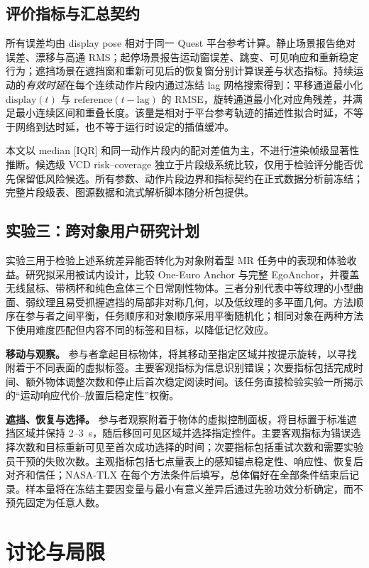 \documentclass[review]{vgtc}
\begin{document}
\subsection{评价指标与汇总契约}

所有误差均由 display pose 相对于同一 Quest 平台参考计算。静止场景报告绝对误差、漂移与高通 RMS；起停场景报告运动窗误差、跳变、可见响应和重新稳定行为；遮挡场景在遮挡窗和重新可见后的恢复窗分别计算误差与状态指标。持续运动的\emph{有效时延}在每个连续动作片段内通过冻结 lag 网格搜索得到：平移通道最小化 $\mathrm{display}(t)$ 与 $\mathrm{reference}(t-\mathrm{lag})$ 的 RMSE，旋转通道最小化对应角残差，并满足最小连续区间和重叠长度。该量是相对于平台参考轨迹的描述性拟合时延，不等于网络到达时延，也不等于运行时设定的插值缓冲。

本文以 median [IQR] 和同一动作片段内的配对差值为主，不进行渲染帧级显著性推断。候选级 VCD risk--coverage 独立于片段级系统比较，仅用于检验评分能否优先保留低风险候选。所有参数、动作片段边界和指标契约在正式数据分析前冻结；完整片段级表、图源数据和流式解析脚本随分析包提供。

\subsection{实验三：跨对象用户研究计划}

实验三用于检验上述系统差异能否转化为对象附着型 MR 任务中的表现和体验收益。研究拟采用被试内设计，比较 One-Euro Anchor 与完整 EgoAnchor，并覆盖无线鼠标、带柄杯和纯色盒体三个日常刚性物体。三者分别代表中等纹理的小型曲面、弱纹理且易受抓握遮挡的局部非对称几何，以及低纹理的多平面几何。方法顺序在参与者之间平衡，任务顺序和对象顺序采用平衡随机化；相同对象在两种方法下使用难度匹配但内容不同的标签和目标，以降低记忆效应。

\textbf{移动与观察。} 参与者拿起目标物体，将其移动至指定区域并按提示旋转，以寻找附着于不同表面的虚拟标签。主要客观指标为信息识别错误；次要指标包括完成时间、额外物体调整次数和停止后首次稳定阅读时间。该任务直接检验实验一所揭示的“运动响应代价--放置后稳定性”权衡。

\textbf{遮挡、恢复与选择。} 参与者观察附着于物体的虚拟控制面板，将目标置于标准遮挡区域并保持 2--3~s，随后移回可见区域并选择指定控件。主要客观指标为错误选择次数和目标重新可见至首次成功选择的时间；次要指标包括重试次数和需要实验员干预的失败次数。主观指标包括七点量表上的感知锚点稳定性、响应性、恢复后对齐和信任；NASA-TLX 在每个方法条件后填写，总体偏好在全部条件结束后记录。样本量将在冻结主要因变量与最小有意义差异后通过先验功效分析确定，而不预先固定为任意人数。

\section{讨论与局限}\label{sec:discussion}
\end{document}
